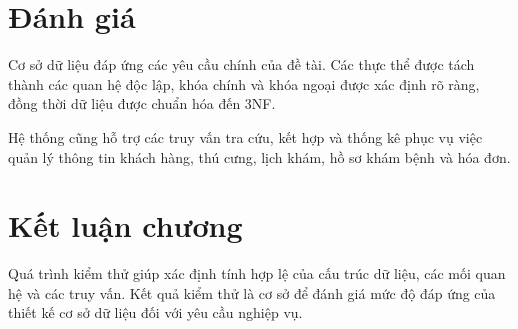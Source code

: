 \section{Đánh giá}

Cơ sở dữ liệu đáp ứng các yêu cầu chính của đề tài. Các thực thể được tách thành các quan hệ độc lập, khóa chính và khóa ngoại được xác định rõ ràng, đồng thời dữ liệu được chuẩn hóa đến 3NF.

Hệ thống cũng hỗ trợ các truy vấn tra cứu, kết hợp và thống kê phục vụ việc quản lý thông tin khách hàng, thú cưng, lịch khám, hồ sơ khám bệnh và hóa đơn.

\section{Kết luận chương}

Quá trình kiểm thử giúp xác định tính hợp lệ của cấu trúc dữ liệu, các mối quan hệ và các truy vấn. Kết quả kiểm thử là cơ sở để đánh giá mức độ đáp ứng của thiết kế cơ sở dữ liệu đối với yêu cầu nghiệp vụ.